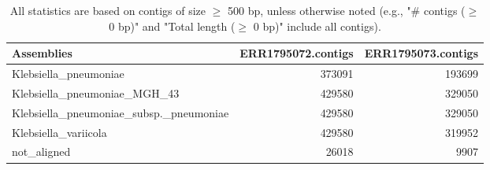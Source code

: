 \documentclass[12pt,a4paper]{article}
\begin{document}
\begin{table}[ht]
\begin{center}
\caption{All statistics are based on contigs of size $\geq$ 500 bp, unless otherwise noted (e.g., "\# contigs ($\geq$ 0 bp)" and "Total length ($\geq$ 0 bp)" include all contigs).}
\begin{tabular}{|l*{2}{|r}|}
\hline
Assemblies & ERR1795072.contigs & ERR1795073.contigs \\ \hline
Klebsiella\_pneumoniae & 373091 & 193699 \\ \hline
Klebsiella\_pneumoniae\_MGH\_43 & 429580 & 329050 \\ \hline
Klebsiella\_pneumoniae\_subsp.\_pneumoniae & 429580 & 329050 \\ \hline
Klebsiella\_variicola & 429580 & 319952 \\ \hline
not\_aligned & 26018 & 9907 \\ \hline
\end{tabular}
\end{center}
\end{table}
\end{document}
